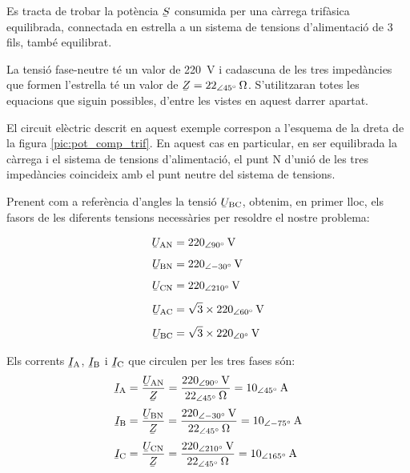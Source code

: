 	
\begin{exemple}[\PotSistTresFils{}]
	\addcontentsxms{\PotSistTresFils}
    Es tracta de trobar la potència $\cmplx{S}$ consumida per una càrrega
    trifàsica equilibrada, connectada en estrella a un sistema de tensions
    d'alimentació  de 3 fils, també equilibrat.

    La tensió fase-neutre
    té un valor de \qty{220}{V} i cadascuna de les tres  impedàncies
    que formen l'estrella té un valor de $\cmplx{Z}=\qtypd{22}{45}{\ohm}$.
     S'utilitzaran totes les equacions que
    siguin possibles, d'entre les vistes en aquest darrer apartat.

    El circuit elèctric descrit en aquest exemple  correspon a
    l'esquema de la dreta de la figura \vref{pic:pot_comp_trif}. En
    aquest cas en particular, en ser equilibrada la càrrega i el
    sistema de tensions d'alimentació, el punt N d'unió de  les tres impedàncies coincideix amb el punt neutre del sistema de tensions.

    Prenent com a referència d'angles la tensió
    $\cmplx{U}\ped{BC}$, obtenim, en primer lloc, els fasors de
    les diferents tensions necessàries per resoldre el nostre
    problema:

    \hfill
    \begin{minipage}[b]{7.5cm}
        
    \end{minipage}
    \hfill
    \begin{minipage}[b][5.7cm][t]{3.8cm}
    \begin{align*}
        \cmplx{U}\ped{AN} &= \qtypd{220}{90}{V} \\[1ex]
        \cmplx{U}\ped{BN} &= \qtypd{220}{-30}{V} \\[1ex]
        \cmplx{U}\ped{CN} &= \qtypd{220}{210}{V} \\[1ex]
        \cmplx{U}\ped{AC} &= \sqrt{3}\times \qtypd{220}{60}{V} \\[1ex]
        \cmplx{U}\ped{BC} &= \sqrt{3}\times \qtypd{220}{0}{V}
    \end{align*}
    \end{minipage}
    \hfill{}

    Els corrents $\cmplx{I}\ped{A}$, $\cmplx{I}\ped{B}$ i $\cmplx{I}\ped{C}$ que
    circulen  per les tres fases són:
    \begin{align*}
        \cmplx{I}\ped{A} &=\frac{\cmplx{U}\ped{AN}}{\cmplx{Z}} =
        \frac{\qtypd{220}{90}{V}}{\qtypd{22}{45}{\ohm}} =
        \qtypd{10}{45}{A}\\[1mm]
        \cmplx{I}\ped{B} &=\frac{\cmplx{U}\ped{BN}}{\cmplx{Z}} =
        \frac{\qtypd{220}{-30}{V}}{\qtypd{22}{45}{\ohm}} =
        \qtypd{10}{-75}{A}\\[1mm]
        \cmplx{I}\ped{C} &=\frac{\cmplx{U}\ped{CN}}{\cmplx{Z}} =
        \frac{\qtypd{220}{210}{V}}{\qtypd{22}{45}{\ohm}} =
        \qtypd{10}{165}{A}
    \end{align*}



\end{exemple}
